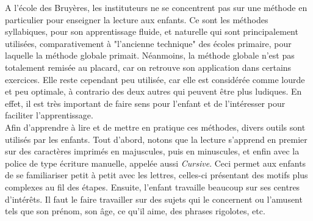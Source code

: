A l'école des Bruyères, les instituteurs ne se concentrent pas sur une méthode en particulier pour enseigner la lecture aux enfants. Ce sont les méthodes syllabiques, pour son apprentissage fluide, et naturelle qui sont principalement utilisées, comparativement à "l'ancienne technique" des écoles primaire, pour laquelle la méthode globale primait. Néanmoins, la méthode globale n'est pas totalement remisée au placard, car on retrouve son application dans certains exercices. Elle reste cependant peu utilisée, car elle est considérée comme lourde et peu optimale, à contrario des deux autres qui peuvent être plus ludiques. En effet, il est très important de faire sens pour l'enfant et de l'intéresser pour faciliter l'apprentissage.\\

Afin d'apprendre à lire et de mettre en pratique ces méthodes, divers outils sont utilisés par les enfants. Tout d'abord, notons que la lecture s'apprend en premier sur des caractères imprimés en majuscules, puis en minuscules, et enfin avec la police de type écriture manuelle, appelée aussi \textit{Cursive}. Ceci permet aux enfants de se familiariser petit à petit avec les lettres, celles-ci présentant des motifs plus complexes au fil des étapes. Ensuite, l'enfant travaille beaucoup sur ses centres d'intérêts. Il faut le faire travailler sur des sujets qui le concernent ou l'amusent tels que son prénom, son âge, ce qu'il aime, des phrases rigolotes, etc.\\

